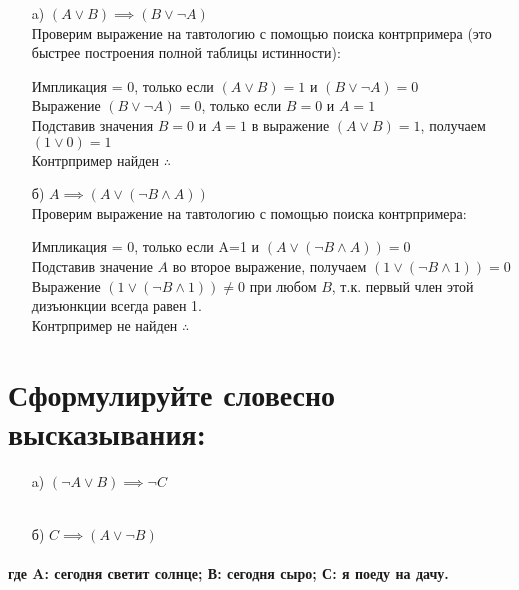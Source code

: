 \documentclass[10pt,a4paper]{article}
\begin{document}
\begin{enumerate}
\item[a)] $(A \lor B)\implies (B \lor \neg A)$ \\[10pt]
Проверим выражение на тавтологию с помощью поиска контрпримера (это быстрее построения полной таблицы истинности):
\begin{center}
Импликация = 0, только если $(A \lor B)=1$ и $(B \lor \neg A)=0$ \\[6pt]
Выражение $(B \lor \neg A)=0$, только если $B=0$ и $A=1$\\[6pt]
Подставив значения $B=0$ и $A=1$ в выражение $(A \lor B)=1$, получаем $(1 \lor 0) = 1$\\[6pt]
Контрпример найден $\therefore$ 

\end{center}

\item[б)] $A \implies (A \lor (\neg B \land A))  $ \\[10pt]
Проверим выражение на тавтологию с помощью поиска контрпримера:
\begin{center}
Импликация = 0, только если A=1 и $(A \lor (\neg B \land A))=0$ \\[6pt]
Подставив значение $A$ во второе выражение, получаем $(1 \lor (\neg B \land 1))=0$ \\[6pt]
Выражение $(1 \lor (\neg B \land 1)) \neq 0$ при любом $B$, т.к. первый член этой дизъюнкции всегда равен 1. \\[6pt]
Контрпример не найден $\therefore$ 

\end{center}

\end{enumerate}

\section{Сформулируйте словесно высказывания:} 

\begin{enumerate}
\item[a)] $(\neg A \lor B)\implies \neg C$ \\[10pt]
 \\[6pt]

\item[б)] $C \implies (A \lor \neg B)$ \\[10pt]

\end{enumerate}

\paragraph{где A: сегодня светит солнце; В: сегодня сыро; С: я поеду на дачу.} 
\end{document}
